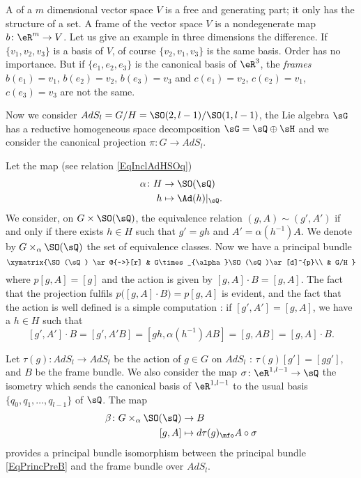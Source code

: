 A  of a $m$ dimensional vector space $V$ is a free and generating part; it only has the structure of a set. A frame of the vector space $V$ is a nondegenerate map $b\colon \eR^{m}\to V$. Let us give an example in three dimensions the difference. If $\{ v_{1},v_{2},v_{3} \}$ is a basis of $V$, of course $\{ v_{2},v_{1},v_{3} \}$ is the same basis. Order has no importance. But if $\{ e_{1},e_{2},e_{3} \}$ is the canonical basis of $\eR^{3}$, the \emph{frames} $b(e_{1})=v_1$, $b(e_{2})=v_2$, $b(e_{3})=v_{3}$ and $c(e_{1})=v_2$, $c(e_{2})=v_1$, $c(e_{3})=v_{3}$ are not the same.

Now we consider $AdS_l=G/H=\SO(2,l-1)/\SO(1,l-1)$, the Lie algebra $\sG$ has a reductive homogeneous space decomposition $\sG=\sQ\oplus\sH$ and we consider the canonical projection $\pi\colon G\to AdS_l$.

Let the map (see relation \eqref{EqInclAdHSOq})
\begin{equation}
\begin{aligned}
 \alpha\colon H&\to \SO(\sQ) \\ 
h&\mapsto \Ad(h)|_{\sQ}.
\end{aligned}
\end{equation}
We consider, on $G\times\SO(\sQ)$, the equivalence relation $(g,A)\sim(g',A')$ if and only if there exists $h\in H$ such that $g'=gh$ and $A'=\alpha(h^{-1})A$. We denote by $G\times_{\alpha}\SO(\sQ)$ the set of equivalence classes. Now we have a principal bundle
\begin{equation}   \label{EqPrincPreB}
\xymatrix{%
   \SO(\sQ) \ar@{~>}[r]     &   G\times_{\alpha}\SO(\sQ)\ar[d]^{p}\\
                &      G/H
}
\end{equation}
where $p[g,A]=[g]$ and the action is given by $[g,A]\cdot B=[g,A]$. The fact that the projection fulfils $p\big( [g,A]\cdot B \big)=p[g,A]$ is evident, and the fact that the action is well defined is a simple computation :
if $[g',A']=[g,A]$, we have a $h\in H$ such that
\[ 
  [g',A']\cdot B=[g',A'B]
        =[gh,\alpha(h^{-1})AB]
        =[g,AB]
        =[g,A]\cdot B.
\]

\begin{proposition}
Let $\tau(g)\colon AdS_l\to AdS_l$ be the action of $g\in G$ on $AdS_l$ : $\tau(g)[g']=[gg']$, and $B$ be the frame bundle. We also consider the map $\sigma\colon \eR^{1,l-1}\to \sQ$ the isometry which sends the canonical basis of $\eR^{1,l-1}$ to the usual basis $\{ q_0,q_{1},\ldots,q_{l-1} \}$ of $\sQ$. The map
\begin{equation}
\begin{aligned}
 \beta\colon G\times_{\alpha} \SO(\sQ)&\to B \\ 
[g,A]&\mapsto d\tau(g)_{\mfo}A\circ\sigma 
\end{aligned}
\end{equation}
provides a principal bundle isomorphism between the principal bundle  \eqref{EqPrincPreB} and the frame bundle over $AdS_l$. 

\end{proposition}

